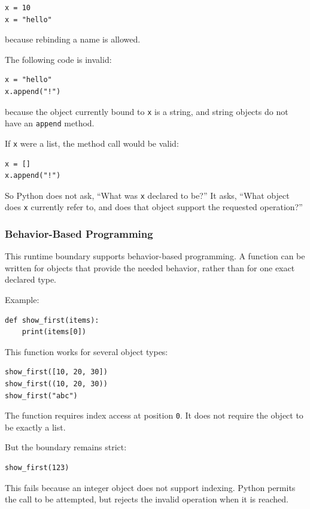 \begin{verbatim}
x = 10
x = "hello"
\end{verbatim}

because rebinding a name is allowed.

The following code is invalid:

\begin{verbatim}
x = "hello"
x.append("!")
\end{verbatim}

because the object currently bound to \texttt{x} is a string, and string objects do not have an \texttt{append} method.

If \texttt{x} were a list, the method call would be valid:

\begin{verbatim}
x = []
x.append("!")
\end{verbatim}

So Python does not ask, ``What was \texttt{x} declared to be?'' It asks, ``What object does \texttt{x} currently refer to, and does that object support the requested operation?''

\subsubsection*{Behavior-Based Programming}

This runtime boundary supports behavior-based programming. A function can be written for objects that provide the needed behavior, rather than for one exact declared type.

Example:

\begin{verbatim}
def show_first(items):
    print(items[0])
\end{verbatim}

This function works for several object types:

\begin{verbatim}
show_first([10, 20, 30])
show_first((10, 20, 30))
show_first("abc")
\end{verbatim}

The function requires index access at position \texttt{0}. It does not require the object to be exactly a list.

But the boundary remains strict:

\begin{verbatim}
show_first(123)
\end{verbatim}

This fails because an integer object does not support indexing. Python permits the call to be attempted, but rejects the invalid operation when it is reached.

